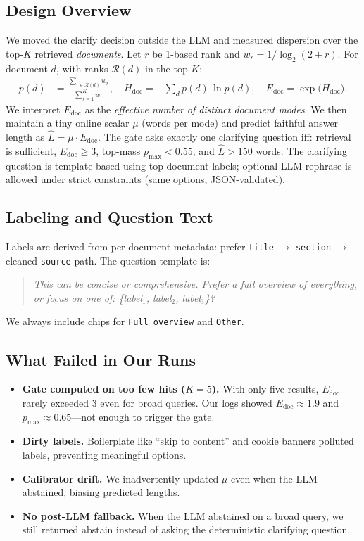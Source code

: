 \documentclass[11pt]{article}
\begin{document}
\subsection{Design Overview}
We moved the clarify decision outside the LLM and measured dispersion over the top-$K$ retrieved \emph{documents}. Let $r$ be 1-based rank and $w_r = 1/\log_2(2+r)$. For document $d$, with ranks $\mathcal{R}(d)$ in the top-$K$:
\begin{align}
p(d) &= \frac{\sum_{r \in \mathcal{R}(d)} w_r}{\sum_{r=1}^K w_r}, \quad
H_{\text{doc}} = - \sum_d p(d)\,\ln p(d), \quad
E_{\text{doc}} = \exp\!\big(H_{\text{doc}}\big).
\end{align}
We interpret $E_{\text{doc}}$ as the \emph{effective number of distinct document modes}. We then maintain a tiny online scalar $\mu$ (words per mode) and predict faithful answer length as $\widehat{L} = \mu \cdot E_{\text{doc}}$. The gate asks exactly one clarifying question iff: retrieval is sufficient, $E_{\text{doc}} \ge 3$, top-mass $p_{\max} < 0.55$, and $\widehat{L} > 150$ words. The clarifying question is template-based using top document labels; optional LLM rephrase is allowed under strict constraints (same options, JSON-validated).

\subsection{Labeling and Question Text}
Labels are derived from per-document metadata: prefer \texttt{title} $\rightarrow$ \texttt{section} $\rightarrow$ cleaned \texttt{source} path. The question template is:
\begin{quote}
\emph{This can be concise or comprehensive. Prefer a full overview of everything, or focus on one of: \{label$_1$, label$_2$, label$_3$\}?}
\end{quote}
We always include chips for \texttt{Full overview} and \texttt{Other}.

\subsection{What Failed in Our Runs}
\begin{itemize}[leftmargin=1.25em]
  \item \textbf{Gate computed on too few hits ($K=5$).} With only five results, $E_{\text{doc}}$ rarely exceeded 3 even for broad queries. Our logs showed $E_{\text{doc}}\approx 1.9$ and $p_{\max}\approx 0.65$---not enough to trigger the gate.
  \item \textbf{Dirty labels.} Boilerplate like ``skip to content'' and cookie banners polluted labels, preventing meaningful options.
  \item \textbf{Calibrator drift.} We inadvertently updated $\mu$ even when the LLM abstained, biasing predicted lengths.
  \item \textbf{No post-LLM fallback.} When the LLM abstained on a broad query, we still returned abstain instead of asking the deterministic clarifying question.
\end{itemize}
\end{document}
